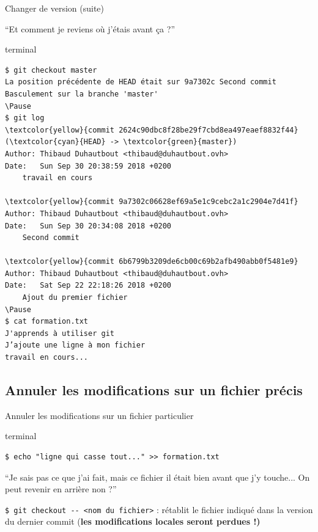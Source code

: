 \documentclass[usepdftitle=false]{beamer}
\def\seplength{.3\topsep}
\newcommand{\Pause}{%
\ifdef{\Release}
  {\pause}
  {}
}
\begin{document}
\begin{frame}[fragile]{Changer de version (suite)}
	\begin{block}{}
		\enquote{Et comment je reviens où j'étais avant ça ?}
	\end{block}
	\Pause
	\begin{beamercolorbox}[rounded=true,shadow=true]{terminal}
\vspace{-\seplength}
\begin{Verbatim}
$ git checkout master
La position précédente de HEAD était sur 9a7302c Second commit
Basculement sur la branche 'master'
\Pause
$ git log
\textcolor{yellow}{commit 2624c90dbc8f28be29f7cbd8ea497eaef8832f44} (\textcolor{cyan}{HEAD} -> \textcolor{green}{master})
Author: Thibaud Duhautbout <thibaud@duhautbout.ovh>
Date:   Sun Sep 30 20:38:59 2018 +0200
    travail en cours

\textcolor{yellow}{commit 9a7302c06628ef69a5e1c9cebc2a1c2904e7d41f}
Author: Thibaud Duhautbout <thibaud@duhautbout.ovh>
Date:   Sun Sep 30 20:34:08 2018 +0200
    Second commit

\textcolor{yellow}{commit 6b6799b3209de6cb00c69b2afb490abb0f5481e9}
Author: Thibaud Duhautbout <thibaud@duhautbout.ovh>
Date:   Sat Sep 22 22:18:26 2018 +0200
    Ajout du premier fichier
\Pause
$ cat formation.txt
J'apprends à utiliser git
J’ajoute une ligne à mon fichier
travail en cours...
\end{Verbatim}
	\end{beamercolorbox}
\end{frame}

\subsection{Annuler les modifications sur un fichier précis}

\begin{frame}[fragile]{Annuler les modifications sur un fichier particulier}

\begin{beamercolorbox}[rounded=true,shadow=true]{terminal}
\vspace{-\seplength}
\begin{Verbatim}
$ echo "ligne qui casse tout..." >> formation.txt
\end{Verbatim}
\end{beamercolorbox}

\Pause

\bigskip

	\begin{block}{}
		\enquote{Je sais pas ce que j'ai fait, mais ce fichier il était bien avant que j'y touche... On peut revenir en arrière non ?}
	\end{block}

\bigskip

\Pause

	\verb+$ git checkout -- <nom du fichier>+ : rétablit le fichier indiqué dans la version du dernier commit (\bf{les modifications locales seront perdues !})

\end{frame}
\end{document}
